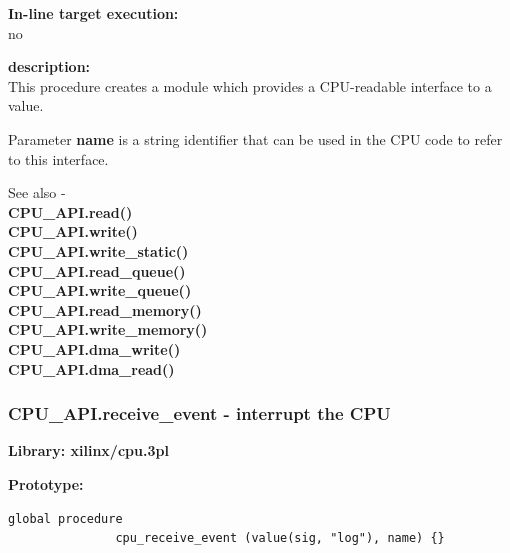             {\bf In-line target execution:} \\
            no
            
            {\bf description:} \\
            This procedure creates a module which provides a CPU-readable
            interface to a value.
            
            Parameter {\bf name} is a string identifier that can be used
            in the CPU code to refer to this interface.
            
            

            See also - \\
            {\bf CPU\_API.read()}  \\
            {\bf CPU\_API.write()}  \\
            {\bf CPU\_API.write\_static()}  \\
            {\bf CPU\_API.read\_queue()}  \\
            {\bf CPU\_API.write\_queue()}  \\
            {\bf CPU\_API.read\_memory()}  \\
            {\bf CPU\_API.write\_memory()}  \\
            {\bf CPU\_API.dma\_write()}  \\
            {\bf CPU\_API.dma\_read()}  \\
           





        \subsubsection{CPU\_API.receive\_event - interrupt the CPU}\label{sec:lprcvevent}

            {\bf Library: xilinx/cpu.3pl}

            {\bf Prototype:} \\
            \vsp
            \begin{lstlisting}[gobble=12, language=threepl]
               global procedure
               cpu_receive_event (value(sig, "log"), name) {}
            \end{lstlisting}


